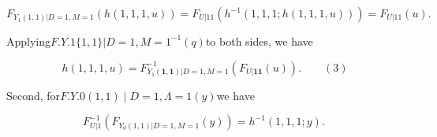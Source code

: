 \documentclass{article}
\begin{document}
\begin{equation}
F _ { Y _ { 1 } ( 1, 1 ) | D = 1, M = 1 } ( h ( 1, 1, 1, u ) ) = F _ { U | 1 1 } ( h ^ { - 1 } ( 1, 1, 1 ; h ( 1, 1, 1, u ) ) ) = F _ { U | 1 1 } ( u ).
\end{equation}


Applying$F . { Y . { 1 } \{ 1, 1 \} | D = 1, M = 1 } ^ { - 1 } ( q )$to both sides, we have


\begin{equation}
h ( 1, 1, 1, u ) = F _ { Y _ { 1 } ( \mathbf { 1 }, \mathbf { 1 } ) | D = 1, M = 1 } ^ { - 1 } ( F _ { U | \mathbf { 1 } \mathbf { 1 } } ( u ) ). \qquad ( 3 )
\end{equation}


Second, for$F . { Y . { 0 } ( 1, 1 ) \mid D = 1, \Lambda = 1 } ( y )$we have


\begin{equation}
F _ { U | 1 } ^ { - 1 } ( F _ { Y _ { 0 } ( 1, 1 ) | D = 1, M = 1 } ( y ) ) = h ^ { - 1 } ( 1, 1, 1 ; y ). ~
\end{equation}
\end{document}
